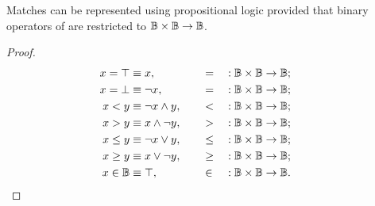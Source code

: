 \begin{lemma}
  Matches can be represented using propositional logic provided that
    binary operators of  are restricted to $\mathbb{B}\times\mathbb{B}\rightarrow\mathbb{B}$.
\end{lemma}
\begin{proof}
  \begin{alignat*}{4}
    x = \top  &\equiv x,               &&\quad=    &&: \mathbb{B}\times\mathbb{B}\rightarrow\mathbb{B}; \\
    x = \bot &\equiv \neg x,          &&\quad=    &&: \mathbb{B}\times\mathbb{B}\rightarrow\mathbb{B}; \\
    x < y      &\equiv \neg x \land y,  &&\quad<    &&: \mathbb{B}\times\mathbb{B}\rightarrow\mathbb{B}; \\
    x > y      &\equiv x \land \neg y,  &&\quad>    &&: \mathbb{B}\times\mathbb{B}\rightarrow\mathbb{B}; \\
    x \leq y   &\equiv \neg x \lor y,   &&\quad\leq &&: \mathbb{B}\times\mathbb{B}\rightarrow\mathbb{B}; \\
    x \geq y   &\equiv x \lor \neg y,   &&\quad\geq &&: \mathbb{B}\times\mathbb{B}\rightarrow\mathbb{B}; \\
    x \in\mathbb{B} &\equiv \top,           &&\quad\in  &&: \mathbb{B}\times\mathbb{B}\rightarrow\mathbb{B}.\tag*{\qedhere}
  \end{alignat*}
\end{proof}

